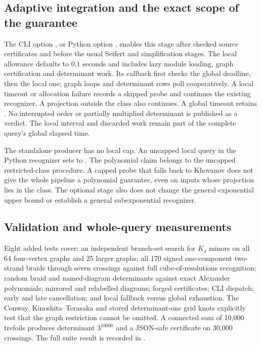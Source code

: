 \subsection{Adaptive integration and the exact scope of the guarantee}

The CLI option , or Python option
, enables this stage after checked source
certificates and before the usual Seifert and simplification stages.
The local allowance defaults to $0.1$ seconds and includes lazy module
loading, graph certification and determinant work.  Its callback first
checks the global deadline, then the local one; graph loops and determinant
rows poll cooperatively.  A local timeout or allocation failure records a
skipped probe and continues the existing recognizer.  A projection outside
the class also continues.  A global timeout retains .
No interrupted order or partially multiplied determinant is published as
a verdict.  The local interval and discarded work remain part of the
complete query's global elapsed time.

The standalone producer has no local cap.  An uncapped local query in the
Python recognizer sets 
to .
The polynomial claim belongs to the uncapped
restricted-class procedure.  A capped probe that falls back to Khovanov
does not give the whole pipeline a polynomial guarantee, even on inputs
whose projection lies in the class.  The optional stage also does not
change the general exponential upper bound or establish a general
subexponential recognizer.

\subsection{Validation and whole-query measurements}

Eight added tests cover: an independent branch-set search for $K_4$ minors
on all 64 four-vertex graphs and 25 larger graphs; all 170 signed
one-component two-strand braids through seven crossings against full
cube-of-resolutions recognition; random braid and named-diagram determinants
against exact Alexander polynomials; mirrored and relabelled diagrams;
forged certificates; CLI dispatch; early and late cancellation; and local
fallback versus global exhaustion.  The Conway, Kinoshita--Terasaka and
stored determinant-one grid knots explicitly test that the graph restriction
cannot be omitted.  A connected sum of 10,000 trefoils produces determinant
$3^{10000}$ and a JSON-safe certificate on 30,000 crossings.  The full suite
result is recorded in .

